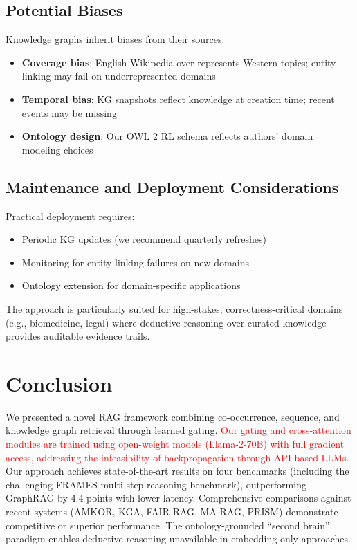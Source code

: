 \documentclass[10pt,twocolumn]{article}
\newcommand{\revisioncritical}[1]{\textcolor{red}{#1}}
\begin{document}
\subsection{Potential Biases}
Knowledge graphs inherit biases from their sources:
\begin{itemize}
    \item \textbf{Coverage bias}: English Wikipedia over-represents Western topics; entity linking may fail on underrepresented domains
    \item \textbf{Temporal bias}: KG snapshots reflect knowledge at creation time; recent events may be missing
    \item \textbf{Ontology design}: Our OWL 2 RL schema reflects authors' domain modeling choices
\end{itemize}

\subsection{Maintenance and Deployment Considerations}
Practical deployment requires:
\begin{itemize}
    \item Periodic KG updates (we recommend quarterly refreshes)
    \item Monitoring for entity linking failures on new domains
    \item Ontology extension for domain-specific applications
\end{itemize}

The approach is particularly suited for high-stakes, correctness-critical domains (e.g., biomedicine, legal) where deductive reasoning over curated knowledge provides auditable evidence trails.

\section{Conclusion}

We presented a novel RAG framework combining co-occurrence, sequence, and knowledge graph retrieval through learned gating. \revisioncritical{Our gating and cross-attention modules are trained using open-weight models (Llama-2-70B) with full gradient access, addressing the infeasibility of backpropagation through API-based LLMs.} Our approach achieves state-of-the-art results on four benchmarks (including the challenging FRAMES multi-step reasoning benchmark), outperforming GraphRAG by 4.4 points with lower latency. Comprehensive comparisons against recent systems (AMKOR, KGA, FAIR-RAG, MA-RAG, PRISM) demonstrate competitive or superior performance. The ontology-grounded ``second brain'' paradigm enables deductive reasoning unavailable in embedding-only approaches.
\end{document}
